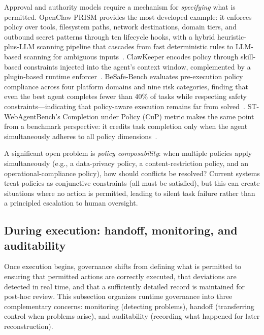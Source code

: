 Approval and authority models require a mechanism for \emph{specifying} what is permitted. OpenClaw PRISM provides the most developed example: it enforces policy over tools, filesystem paths, network destinations, domain tiers, and outbound secret patterns through ten lifecycle hooks, with a hybrid heuristic-plus-LLM scanning pipeline that cascades from fast deterministic rules to LLM-based scanning for ambiguous inputs~\cite{openclawprism2026}. ClawKeeper encodes policy through skill-based constraints injected into the agent's context window, complemented by a plugin-based runtime enforcer~\cite{clawkeeper2026}. BeSafe-Bench evaluates pre-execution policy compliance across four platform domains and nine risk categories, finding that even the best agent completes fewer than 40\% of tasks while respecting safety constraints---indicating that policy-aware execution remains far from solved~\cite{besafebench2026}. ST-WebAgentBench's Completion under Policy (CuP) metric makes the same point from a benchmark perspective: it credits task completion only when the agent simultaneously adheres to all policy dimensions~\cite{stwebagentbench2025}.

A significant open problem is \emph{policy composability}: when multiple policies apply simultaneously (e.g., a data-privacy policy, a content-restriction policy, and an operational-compliance policy), how should conflicts be resolved? Current systems treat policies as conjunctive constraints (all must be satisfied), but this can create situations where no action is permitted, leading to silent task failure rather than a principled escalation to human oversight.

\subsection{During execution: handoff, monitoring, and auditability}

Once execution begins, governance shifts from defining what is permitted to ensuring that permitted actions are correctly executed, that deviations are detected in real time, and that a sufficiently detailed record is maintained for post-hoc review. This subsection organizes runtime governance into three complementary concerns: monitoring (detecting problems), handoff (transferring control when problems arise), and auditability (recording what happened for later reconstruction).

